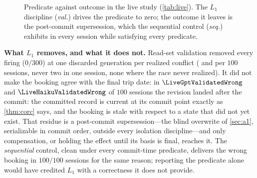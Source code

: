 \ifnum{} \else
\begin{figure}[t]
\centering
{}
\caption{Predicate against outcome in the live study (\cref{tab:live}). The
$L_1$ discipline (\emph{val.}) drives the predicate to zero; the outcome it
leaves is the post-commit supersession, which the sequential control
(\emph{seq.}) exhibits in every session while satisfying every predicate.}
\label{fig:outcome}
\end{figure}
\fi

\smallskip\noindent\textbf{What $L_1$ removes, and what it does not.}
Read-set validation removed every firing ($0/300$) at one discarded
generation per realized conflict (\LiveGptRegen{} and \LiveHaikuRegen{} per
$100$ sessions, never two in one session, none where the race never
realized). It did not make the booking agree with the final trip date: in
$\LiveGptValidatedWrong$ and $\LiveHaikuValidatedWrong$ of $100$ sessions the
revision landed after the commit: the committed record is current at its
commit point exactly as \cref{thm:corc} says, and the booking is stale with
respect to a state that did not yet exist. That residue is a post-commit
supersession---the blind overwrite of \cref{sec:a1}, serializable in commit
order, outside every isolation discipline---and only compensation, or
holding the effect until its basis is final, reaches it. The
\emph{sequential} control, clean under every commit-time predicate, delivers
the wrong booking in $100/100$ sessions for the same reason; reporting the
predicate alone would have credited $L_1$ with a correctness it does not
provide.

